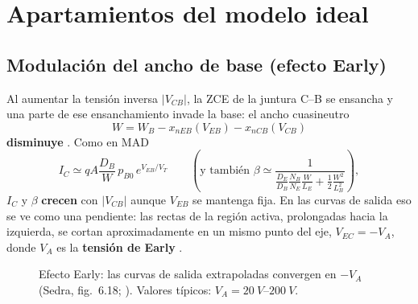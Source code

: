 \section{Apartamientos del modelo ideal}

\subsection{Modulación del ancho de base (efecto Early)}
\label{sec:early}

Al aumentar la tensión inversa $|V_{CB}|$, la ZCE de la juntura C--B se ensancha y una parte
de ese ensanchamiento invade la base: el ancho cuasineutro
\[
  W = W_B - x_{nEB}(V_{EB}) - x_{nCB}(V_{CB})
\]
\textbf{disminuye} . Como en MAD
\[
  I_C \simeq qA\frac{D_B}{W}\,p_{B0}\,e^{V_{EB}/V_T}
  \qquad\left(\text{y también } \beta\simeq\frac{1}{\frac{D_E}{D_B}\frac{N_B}{N_E}\frac{W}{L_E}+\frac12\frac{W^2}{L_B^2}}\right),
\]
$I_C$ y $\beta$ \textbf{crecen} con $|V_{CB}|$ aunque $V_{EB}$ se mantenga fija. En las curvas de
salida eso se ve como una pendiente: las rectas de la región activa, prolongadas hacia la
izquierda, se cortan aproximadamente en un mismo punto del eje, $V_{EC}=-V_A$, donde $V_A$ es
la \textbf{tensión de Early} .

\begin{figure}[H]
\centering
{}
\caption{Efecto Early: las curvas de salida extrapoladas convergen en $-V_A$ (Sedra, fig.~6.18;
). Valores típicos: $V_A=\SIrange{20}{200}{V}$.}
\label{fig:early}
\end{figure}

